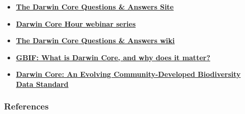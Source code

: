 \documentclass[]{book}
\begin{document}
\begin{itemize}
\item
  \textbf{\href{https://github.com/tdwg/dwc-qa\%20target=\%22_blank\%22}{The
  Darwin Core Questions \& Answers Site}}
\item
  \textbf{\href{https://github.com/tdwg/dwc-qa/wiki/Webinars\%20target=\%22_blank\%22}{Darwin
  Core Hour webinar series}}
\item
  \textbf{\href{https://github.com/tdwg/dwc-qa/wiki\%20target=\%22_blank\%22}{The
  Darwin Core Questions \& Answers wiki}}
\item
  \textbf{\href{https://www.gbif.org/darwin-core\%20target=\%22_blank\%22}{GBIF:
  What is Darwin Core, and why does it matter?}}
\item
  \textbf{\href{https://doi.org/10.1371/journal.pone.0029715\%20target=\%22_blank\%22}{Darwin
  Core: An Evolving Community-Developed Biodiversity Data Standard}
  \citep{DwC-paper} }
\end{itemize}

\subsubsection*{References}\label{references-1}


\end{document}
